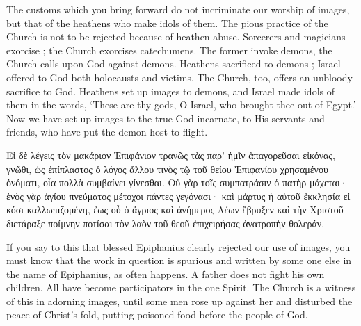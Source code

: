 \documentclass[10pt]{book}
\newcommand{\switchGreek}[1][]{\selectlanguage{polutonikogreek} \switchcolumn*[#1]}
\newcommand{\switchEnglish}{\selectlanguage{english} \switchcolumn}
\begin{document}
\begin{paracol}{2}
\switchEnglish

The customs which you bring forward do 
not incriminate our worship of images, but that 
of the heathens who make idols of them. The 
pious practice of the Church is not to be rejected
because of heathen abuse. Sorcerers 
and magicians exorcise ; the Church exorcises 
catechumens. The former invoke demons, 
the Church calls upon God against demons. 
Heathens sacrificed to demons ; Israel offered 
to God both holocausts and victims. The 
Church, too, offers an unbloody sacrifice to 
God. Heathens set up images to demons, 
and Israel made idols of them in the words, 
`These are thy gods, O Israel, who brought 
thee out of Egypt.' Now we have set up 
images to the true God incarnate, to His 
servants and friends, who have put the demon 
host to flight.

\switchGreek

Εἰ δὲ λέγεις τὸν μακάριον Ἐπιφάνιον τρανῶς τὰς παρ’ ἡμῖν ἀπαγορεῦσαι
εἰκόνας, γνῶθι, ὡς ἐπίπλαστος ὁ λόγος ἄλλου τινὸς τῷ τοῦ θείου Ἐπιφανίου
χρησαμένου ὀνόματι, οἷα πολλὰ συμβαίνει γίνεσθαι. Οὐ γὰρ τοῖς συμπατράσιν ὁ
πατὴρ μάχεται· ἑνὸς γὰρ ἁγίου πνεύματος μέτοχοι πάντες γεγόνασι· καὶ μάρτυς
ἡ αὐτοῦ ἐκκλησία εἰ κόσι καλλωπιζομένη, ἕως οὗ ὁ ἄγριος καὶ ἀνήμερος Λέων
ἔβρυξεν καὶ τὴν Χριστοῦ διετάραξε ποίμνην ποτίσαι τὸν λαὸν τοῦ θεοῦ
ἐπιχειρήσας ἀνατροπὴν θολεράν.

\switchEnglish

If you say to this that blessed 
Epiphanius clearly rejected our use of images, 
you must know that the work in question is 
spurious and written by some one else in the 
name of Epiphanius, as often happens. A 
father does not fight his own children. All 
have become participators in the one Spirit. 
The Church is a witness of this in adorning 
images, until some men rose up against her 
and disturbed the peace of Christ's fold, putting 
poisoned food before the people of God. 




\end{paracol}
\end{document}
